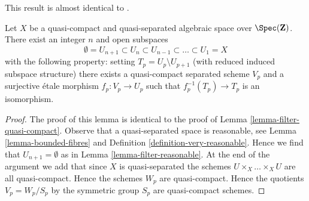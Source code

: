 \begin{lemma}
\label{lemma-filter-quasi-compact-quasi-separated}
\begin{reference}
This result is almost identical to \cite[Proposition 5.7.8]{GruRay}.
\end{reference}
Let $X$ be a quasi-compact and quasi-separated algebraic space over
$\Spec(\mathbf{Z})$. There exist an integer $n$ and open subspaces
$$
\emptyset = U_{n + 1} \subset
U_n \subset U_{n - 1} \subset \ldots \subset U_1 = X
$$
with the following property: setting $T_p = U_p \setminus U_{p + 1}$
(with reduced induced subspace structure) there exists a quasi-compact
separated scheme $V_p$ and a surjective \'etale morphism $f_p : V_p \to U_p$
such that $f_p^{-1}(T_p) \to T_p$ is an isomorphism.
\end{lemma}

\begin{proof}
The proof of this lemma is identical to the proof of
Lemma \ref{lemma-filter-quasi-compact}.
Observe that a quasi-separated space is reasonable, see
Lemma \ref{lemma-bounded-fibres} and
Definition \ref{definition-very-reasonable}.
Hence we find that $U_{n + 1} = \emptyset$ as in
Lemma \ref{lemma-filter-reasonable}.
At the end of the argument we add that since $X$ is quasi-separated
the schemes $U \times_X \ldots \times_X U$ are all quasi-compact.
Hence the schemes $W_p$ are quasi-compact. Hence the
quotients $V_p = W_p/S_p$ by the symmetric group $S_p$ are quasi-compact
schemes.
\end{proof}
